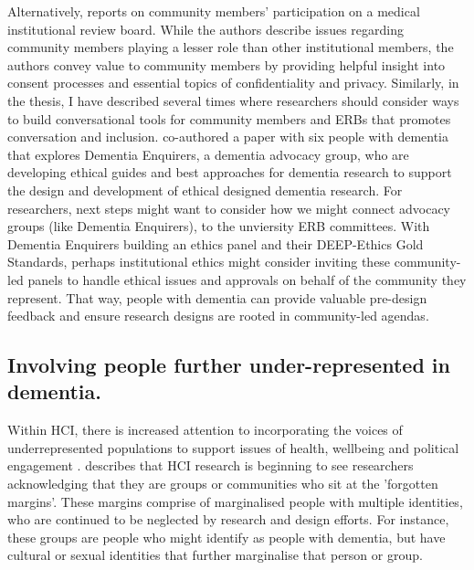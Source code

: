 Alternatively, \cite{lidz2012participation} reports on community members' participation on a medical institutional review board. While the authors describe issues regarding community members playing a lesser role than other institutional members, the authors convey value to community members by providing helpful insight into consent processes and essential topics of confidentiality and privacy. Similarly, in the thesis, I have described several times where researchers should consider ways to build conversational tools for community members and ERBs that promotes conversation and inclusion. \cite{davies2021dementia} co-authored a paper with six people with dementia that explores Dementia Enquirers, a dementia advocacy group, who are developing ethical guides and best approaches for dementia research to support the design and development of ethical designed dementia research. For researchers, next steps might want to consider how we might connect advocacy groups (like Dementia Enquirers), to the unviersity ERB committees. With Dementia Enquirers building an ethics panel and their DEEP-Ethics Gold Standards, perhaps institutional ethics might consider inviting these community-led panels to handle ethical issues and approvals on behalf of the community they represent. That way, people with dementia can provide valuable pre-design feedback and ensure research designs are rooted in community-led agendas. 


\subsection{Involving people further under-represented in dementia.}
\label{Under-represented--dementia}
Within HCI, there is increased attention to incorporating the voices of underrepresented populations to support issues of health, wellbeing and political engagement \citep{erete_intersectional_2018}. \cite{harrington_forgotten_2020} describes that HCI research is beginning to see researchers acknowledging that they are groups or communities who sit at the 'forgotten margins'. These margins comprise of marginalised people with multiple identities, who are continued to be neglected by research and design efforts. For instance, these groups are people who might identify as people with dementia, but have cultural or sexual identities that further marginalise that person or group. 

